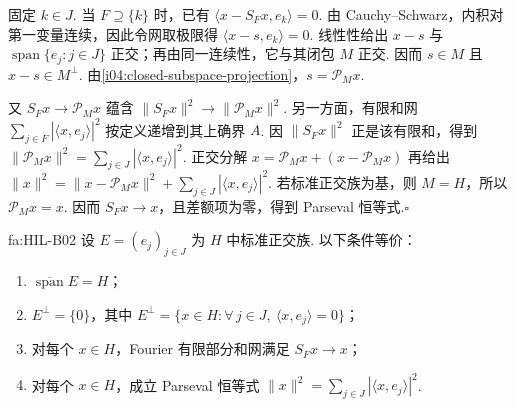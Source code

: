 \begin{FAProof}
固定 \(\displaystyle k\in J\). 当 \(\displaystyle F\supseteq\{k\}\) 时，已有 \(\displaystyle \langle x-S_Fx,e_k\rangle=0\). 由 Cauchy--Schwarz，内积对第一变量连续，因此令网取极限得 \(\displaystyle \langle x-s,e_k\rangle=0\). 线性性给出 \(\displaystyle x-s\) 与 \(\displaystyle \operatorname{span}\{e_j:j\in J\}\) 正交；再由同一连续性，它与其闭包 \(\displaystyle M\) 正交. 因而 \(\displaystyle s\in M\) 且 \(\displaystyle x-s\in M^\perp\). 由\autoref{i04:closed-subspace-projection}，\(\displaystyle s=\mathcal P_Mx\).

又 \(\displaystyle S_Fx\to\mathcal P_Mx\) 蕴含 \(\displaystyle \|S_Fx\|^2\to\|\mathcal P_Mx\|^2\). 另一方面，有限和网
\(\displaystyle \sum_{j\in F}|\langle x,e_j\rangle|^2\)
按定义递增到其上确界 \(\displaystyle A\). 因 \(\displaystyle \|S_Fx\|^2\) 正是该有限和，得到 \(\displaystyle \|\mathcal P_Mx\|^2 =\sum_{j\in J}|\langle x,e_j\rangle|^2\).
正交分解 \(\displaystyle x=\mathcal P_Mx+(x-\mathcal P_Mx)\) 再给出 \(\displaystyle \|x\|^2 =\|x-\mathcal P_Mx\|^2 +\sum_{j\in J}|\langle x,e_j\rangle|^2\).
若标准正交族为基，则 \(\displaystyle M=H\)，所以 \(\displaystyle \mathcal P_Mx=x\). 因而 \(\displaystyle S_Fx\to x\)，且差额项为零，得到 Parseval 恒等式.\hfill\(\square\)

\end{FAProof}

\begin{FATheorem}[B][正交基完备性判据]{fa:HIL-B02}
设 \(\displaystyle E=(e_j)_{j\in J}\) 为 \(\displaystyle H\) 中标准正交族. 以下条件等价：
\begin{enumerate}[label=\textnormal{(\arabic*)}]
\item \(\displaystyle \overline{\operatorname{span}}E=H\)；
\item \(\displaystyle E^\perp=\{0\}\)，其中 \(\displaystyle E^\perp=\{x\in H:\forall\,j\in J,\ \langle x,e_j\rangle=0\}\)；
\item 对每个 \(\displaystyle x\in H\)，Fourier 有限部分和网满足 \(\displaystyle S_Fx\to x\)；
\item 对每个 \(\displaystyle x\in H\)，成立 Parseval 恒等式 \(\displaystyle \|x\|^2=\sum_{j\in J}|\langle x,e_j\rangle|^2\).
\end{enumerate}
\end{FATheorem}

